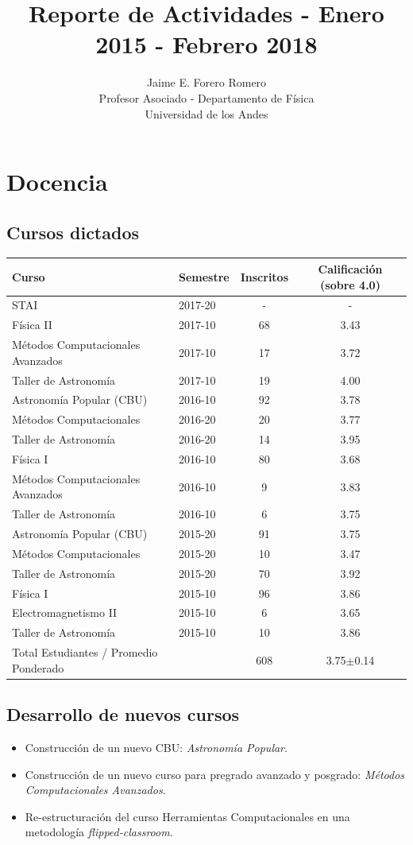 \documentclass{article}
\title{Reporte de Actividades - Enero 2015 - Febrero 2018}
\author{Jaime E. Forero Romero\\Profesor Asociado - Departamento de
  F\'isica\\Universidad de los Andes}
\begin{document}
\maketitle
\tableofcontents
\newpage

\section{Docencia}

\subsection{Cursos dictados}
\begin{tabular}{p{6.5cm} l c c}\hline
Curso & Semestre & Inscritos & Calificaci\'on (sobre
4.0)\\\hline
STAI & 2017-20 & - & -\\\hline
F\'isica II & 2017-10 & 68 & 3.43\\
M\'etodos Computacionales Avanzados & 2017-10 & 17 & 3.72\\ 
Taller de Astronom\'ia & 2017-10 & 19 & 4.00\\\hline
Astronom\'ia Popular (CBU) & 2016-10 & 92 & 3.78\\
M\'etodos Computacionales & 2016-20 & 20 & 3.77\\
Taller de Astronom\'ia & 2016-20 & 14 & 3.95\\\hline
F\'isica I & 2016-10 & 80 & 3.68\\
M\'etodos Computacionales Avanzados & 2016-10 & 9 & 3.83\\
Taller de Astronom\'ia & 2016-10 & 6 & 3.75\\\hline
Astronom\'ia Popular (CBU) & 2015-20 & 91 & 3.75\\ 
M\'etodos Computacionales & 2015-20 & 10 & 3.47\\
Taller de Astronom\'ia & 2015-20 & 70 & 3.92\\\hline
F\'isica I & 2015-10 & 96 & 3.86\\
Electromagnetismo II & 2015-10 & 6 & 3.65 \\
Taller de Astronom\'ia & 2015-10 & 10 & 3.86\\\hline
Total Estudiantes / Promedio Ponderado & & 608 & 3.75$\pm$0.14 \\\hline
\end{tabular}

\subsection{Desarrollo de nuevos cursos}
\begin{itemize}
\item Construcci\'on de un nuevo CBU: \emph{Astronom\'ia Popular}.
\item Construcci\'on de un nuevo curso para pregrado avanzado y
  posgrado: \emph{M\'etodos Computacionales Avanzados}.
\item Re-estructuraci\'on del curso Herramientas Computacionales en
  una metodolog\'ia \emph{flipped-classroom}.
\end{itemize}
\end{document}
